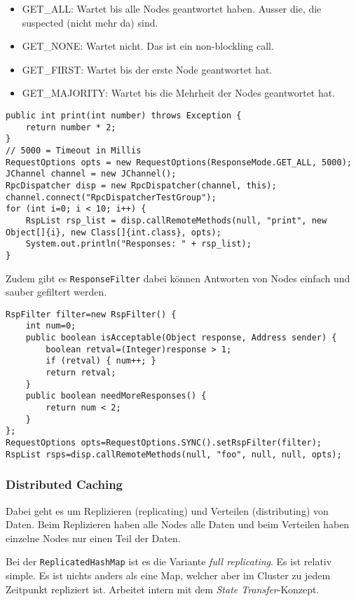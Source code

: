 \begin{itemize}
	\item GET\_ALL: Wartet bis alle Nodes geantwortet haben. Ausser die, die suspected (nicht mehr da) sind.
	\item GET\_NONE: Wartet nicht. Das ist ein non-blockling call.
	\item GET\_FIRST: Wartet bis der erste Node geantwortet hat.
	\item GET\_MAJORITY: Wartet bis die Mehrheit der Nodes geantwortet hat.
\end{itemize}
	
\begin{lstlisting}
public int print(int number) throws Exception {
	return number * 2;
} 
// 5000 = Timeout in Millis
RequestOptions opts = new RequestOptions(ResponseMode.GET_ALL, 5000);
JChannel channel = new JChannel();
RpcDispatcher disp = new RpcDispatcher(channel, this);
channel.connect("RpcDispatcherTestGroup");
for (int i=0; i < 10; i++) {
	RspList rsp_list = disp.callRemoteMethods(null, "print", new Object[]{i}, new Class[]{int.class}, opts);
	System.out.println("Responses: " + rsp_list);
}
\end{lstlisting}
	
Zudem gibt es \verb|ResponseFilter| dabei können Antworten von Nodes einfach und sauber gefiltert werden.
	
\begin{lstlisting}
RspFilter filter=new RspFilter() {
	int num=0;
	public boolean isAcceptable(Object response, Address sender) {
		boolean retval=(Integer)response > 1;
		if (retval) { num++; }
		return retval;
	}
	public boolean needMoreResponses() {
		return num < 2;
	}
};
RequestOptions opts=RequestOptions.SYNC().setRspFilter(filter);
RspList rsps=disp.callRemoteMethods(null, "foo", null, null, opts);
\end{lstlisting}
	
\subsubsection{Distributed Caching}

Dabei geht es um Replizieren (replicating) und Verteilen (distributing) von Daten. Beim Replizieren haben alle Nodes alle Daten und beim Verteilen haben  einzelne Nodes nur einen Teil der Daten.
	
Bei der \verb|ReplicatedHashMap| ist es die Variante \emph{full replicating}. Es ist relativ simple. Es ist nichts anders als eine Map, welcher aber im Cluster zu jedem Zeitpunkt repliziert ist. Arbeitet intern mit dem \emph{State Transfer}-Konzept.
	
